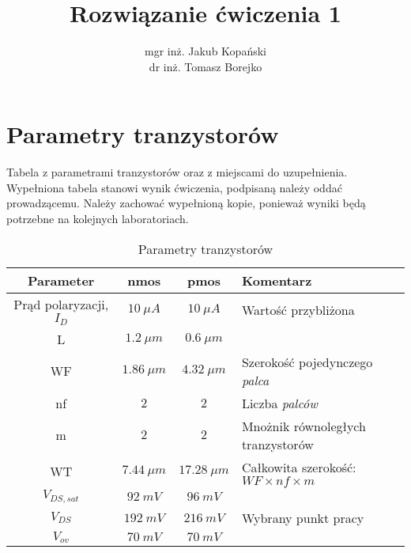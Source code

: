 \documentclass[twoside,pl,final]{labman}
\title{Rozwiązanie ćwiczenia 1}
\author{mgr inż. Jakub Kopański\\
dr inż. Tomasz Borejko}
\begin{document}
\maketitle

\appendix
\chapter{Parametry tranzystorów}
\label{app:devices}

Tabela z parametrami tranzystorów oraz z miejscami do uzupełnienia.
Wypełniona tabela stanowi wynik ćwiczenia,
podpisaną należy oddać prowadzącemu.
Należy zachować wypełnioną kopie,
ponieważ wyniki będą potrzebne na kolejnych laboratoriach.

\begin{table}[htbp]
  \centering
  \caption{Parametry tranzystorów}
  \label{tab:devices}
  \begin{tabular}{ || c | c | c | p{} || }
    \hline \hline
    Parameter & nmos & pmos & Komentarz \\
    \hline
    Prąd polaryzacji, $I_D$ & $10~\mu{}A$                  & $10~\mu{}A$    & Wartość przybliżona                          \\ \hline
    L                       & $1.2~\mu{}m$                 & $0.6~\mu{}m$   &                                              \\ \hline
    WF                      & $1.86~\mu{}m$                & $4.32~\mu{}m$  & Szerokość pojedynczego \emph{palca}          \\ \hline
    nf                      & $2$                          & $2$            & Liczba \emph{palców}                         \\ \hline
    m                       & $2$                          & $2$            & Mnożnik równoległych tranzystorów            \\ \hline
    WT                      & $7.44~\mu{}m$                & $17.28~\mu{}m$ & Całkowita szerokość: $WF \times nf \times m$ \\ \hline
    $V_{DS,sat}$            & $92~mV$                      & $96~mV$        &                                              \\ \hline
    $V_{DS}$                & $192~mV$                     & $216~mV$       & Wybrany punkt pracy                          \\ \hline
    $V_{ov}$                & $70~mV$                      & $70~mV$        &                                              \\ \hline

\end{tabular}
\end{table}
\end{document}
